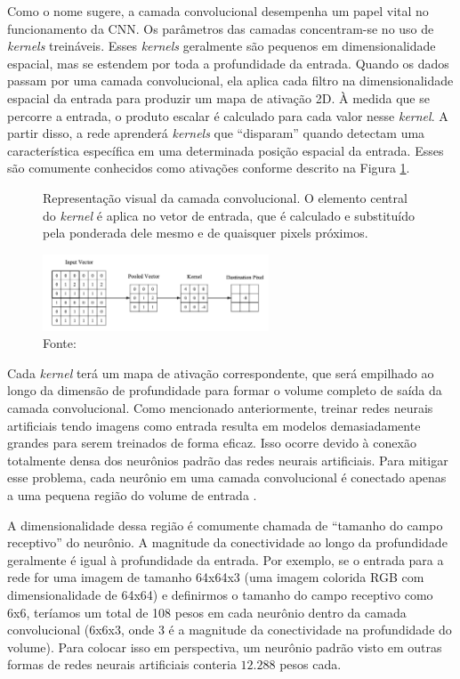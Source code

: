 Como o nome sugere, a camada convolucional desempenha um papel vital no funcionamento da \gls{CNN}. Os parâmetros das camadas concentram-se no uso de \textit{kernels} treináveis. Esses \textit{kernels} geralmente são pequenos em dimensionalidade espacial, mas se estendem por toda a profundidade da entrada. Quando os dados passam por uma camada convolucional, ela aplica cada filtro na dimensionalidade espacial da entrada para produzir um mapa de ativação 2D. À medida que se percorre a entrada, o produto escalar é calculado para cada valor nesse \textit{kernel}. A partir disso, a rede aprenderá \textit{kernels} que ``disparam'' quando detectam uma característica específica em uma determinada posição espacial da entrada. Esses são comumente conhecidos como ativações conforme descrito na Figura \ref{fig:fig024}.

\begin{figure}[h!]
    \centering
    \caption{Representação visual da camada convolucional. O elemento central do \textit{kernel} é aplica no vetor de entrada, que é calculado e substituído pela ponderada dele mesmo e de quaisquer pixels próximos.}
    \includegraphics[width=0.6\textwidth]{figures/fig024.png}
    \caption*{Fonte: \cite{osheaIntroductionConvolutionalNeural2015c}}
    \label{fig:fig024}
\end{figure}

Cada \textit{kernel} terá um mapa de ativação correspondente, que será empilhado ao longo da dimensão de profundidade para formar o volume completo de saída da camada convolucional. Como mencionado anteriormente, treinar redes neurais artificiais tendo imagens como entrada resulta em modelos demasiadamente grandes para serem treinados de forma eficaz. Isso ocorre devido à conexão totalmente densa dos neurônios padrão das redes neurais artificiais. Para mitigar esse problema, cada neurônio em uma camada convolucional é conectado apenas a uma pequena região do volume de entrada \cite{osheaIntroductionConvolutionalNeural2015c}. 

A dimensionalidade dessa região é comumente chamada de ``tamanho do campo receptivo'' do neurônio. A magnitude da conectividade ao longo da profundidade geralmente é igual à profundidade da entrada. Por exemplo, se o entrada para a rede for uma imagem de tamanho 64x64x3 (uma imagem colorida RGB com dimensionalidade de 64x64) e definirmos o tamanho do campo receptivo como 6x6, teríamos um total de 108 pesos em cada neurônio dentro da camada convolucional (6x6x3, onde 3 é a magnitude da conectividade na profundidade do volume). Para colocar isso em perspectiva, um neurônio padrão visto em outras formas de redes neurais artificiais conteria $12.288$ pesos cada. 

